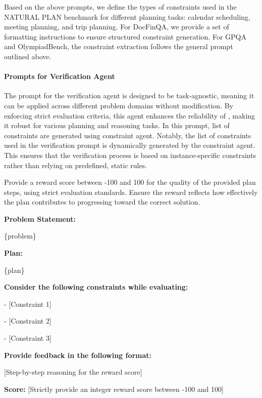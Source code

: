 Based on the above prompts, we define the types of constraints used in the NATURAL PLAN benchmark for different planning tasks: calendar scheduling, meeting planning, and trip planning. For DocFinQA, we provide a set of formatting instructions to ensure structured constraint generation. For GPQA and OlympiadBench, the constraint extraction follows the general prompt outlined above.

\paragraph{Prompts for Verification Agent}

The prompt for the verification agent is designed to be task-agnostic, meaning it can be applied across different problem domains without modification. By enforcing strict evaluation criteria, this agent enhances the reliability of \plangen{}, making it robust for various planning and reasoning tasks. In this prompt, list of constraints are generated using constraint agent. Notably, the list of constraints used in the verification prompt is dynamically generated by the constraint agent. This ensures that the verification process is based on instance-specific constraints rather than relying on predefined, static rules.

\begin{tcolorbox}[boxrule=0pt, frame hidden, title=Prompt, breakable, sharp corners, borderline west={2pt}{0pt}{black!50}, title style={
        colback=black!50, %
        colframe=black!50, %
        coltitle=black %
    }]

Provide a reward score between -100 and 100 for the quality of the provided plan steps, using strict evaluation standards. Ensure the reward reflects how effectively the plan contributes to progressing toward the correct solution.

\textbf{Problem Statement:}

\{problem\}

\textbf{Plan:}

\{plan\}

\textbf{Consider the following constraints while evaluating:}

- [Constraint 1]

- [Constraint 2]

- [Constraint 3]

\textbf{Provide feedback in the following format:}

[Step-by-step reasoning for the reward score]

\textbf{Score:} [Strictly provide an integer reward score between -100 and 100]
\end{tcolorbox}

